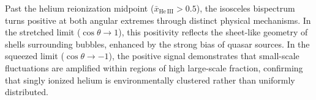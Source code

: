 \documentclass[apj,twocolumn, appendixfloats, twocolappendix, numberedappendix, tighten]{openjournal}
\begin{document}

Past the helium reionization midpoint ($\bar{x}_\mathrm{He\,III} > 0.5$), the isosceles bispectrum turns positive at both angular extremes through distinct physical mechanisms. In the stretched limit ($\cos\theta \to 1$), this positivity reflects the sheet-like geometry of  shells surrounding  bubbles, enhanced by the strong bias of quasar sources. In the squeezed limit ($\cos\theta \to -1$), the positive signal demonstrates that small-scale  fluctuations are amplified within regions of high large-scale  fraction, confirming that singly ionized helium is environmentally clustered rather than uniformly distributed.

\end{document}
